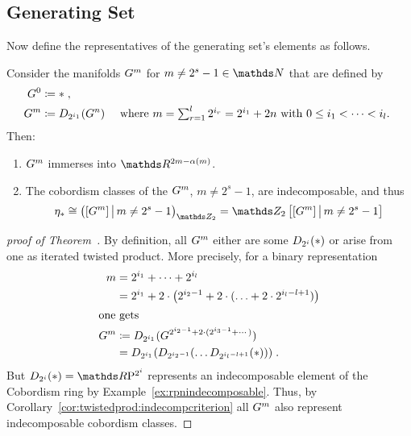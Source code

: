   \subsection{Generating Set}
  Now define the representatives of the generating set's elements as follows.
  \begin{Thm}\label{thm:brownproof}
    Consider the manifolds $G^{m}$ for $m\neq 2^s-1\in\Nat$ that are
    defined by
    \begin{align*}
      G^{0} &\coloneqq * \;, \\
      G^{m} &\coloneqq D_{2^{i_1}}({G^{n}})
           &\text{
             where
             $\textstyle m=\sum_{r=1}^l 2^{i_r}=2^{i_1}+2n$
             with $0\leq i_1<\dotsb<i_l$.
             }
    \end{align*}
    Then:
    \begin{enumerate}
    \item\label{item:brownimmersionproperty}
      $G^{m}$ immerses into $\R^{2m-\alpha(m)}$.
    \item\label{item:indecomposabilityproperty}
      The cobordism classes of the $G^{m}$, $m\neq 2^s-1$, are
      indecomposable, and thus
      \begin{gather*}
        \c_*\cong \left( [\G m] \,\big|\, m\neq 2^s-1 \right)_{\Zmod2}
        = \Zmod2\left[[\G m] \,\big|\, m\neq 2^s-1\right]
      \end{gather*}
    \end{enumerate}
  \end{Thm}
  \begin{proof}[proof of
    Theorem~]
    By definition, all $G^{m}$ either are some $D_{2^i}({*})$
    or arise from one as iterated twisted product. More precisely, for a binary
    representation
    \begin{align*}
      m &= 2^{i_1}+\dotsb + 2^{i_l} \\
        &= 2^{i_1}+ 2\cdot\big( 2^{i_2-1} + 2\cdot(\dotsc + 2\cdot 2^{i_l-l+1})\big)
      \\\intertext{one gets}
      G^{m} &\coloneqq
             D_{2^{i_1}}({G^{2^{i_2-1} + 2\cdot(2^{i_3-1}+\dotsb)}})\\
        &= D_{2^{i_1}}({
          D_{2^{i_2-1}}({
          \dotsc
          D_{2^{i_l-l+1}}({*})
          })})
          \;.
    \end{align*}
    But $\Twistedprod{2^{i}}{\pt}=\RP{2^i}$ represents an indecomposable
    element of the Cobordism ring by Example~\ref{ex:rpnindecomposable}.
    Thus, by Corollary~\ref{cor:twistedprod:indecompcriterion} all
    $G^{m}$ also represent indecomposable cobordism classes.
  \end{proof}
